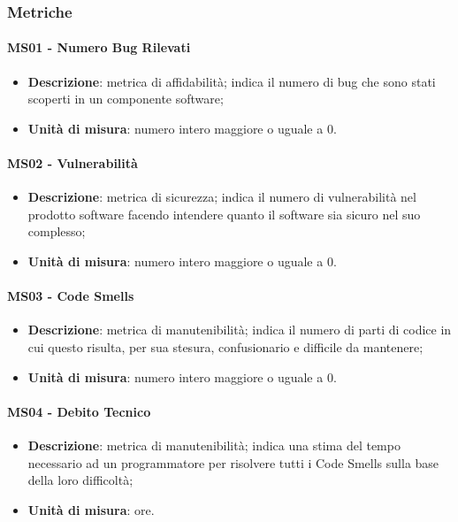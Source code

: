 	\subsubsection{Metriche}
		\paragraph{MS01 - Numero Bug Rilevati}
		\begin{itemize}
			\item \textbf{Descrizione}: metrica di affidabilità; indica il numero di bug che sono stati scoperti in un componente software;
			\item \textbf{Unità di misura}: numero intero maggiore o uguale a 0.
		\end{itemize}

        \paragraph{MS02 - Vulnerabilità}
        \begin{itemize}
            \item \textbf{Descrizione}: metrica di sicurezza; indica il numero di vulnerabilità nel prodotto software facendo intendere quanto il software sia sicuro nel suo complesso;
            \item \textbf{Unità di misura}: numero intero maggiore o uguale a 0.
        \end{itemize}

        \paragraph{MS03 - Code Smells}
        \begin{itemize}
            \item \textbf{Descrizione}: metrica di manutenibilità; indica il numero di parti di codice in cui questo risulta, per sua stesura, confusionario e difficile da mantenere;
            \item \textbf{Unità di misura}: numero intero maggiore o uguale a 0.
        \end{itemize}

        \paragraph{MS04 - Debito Tecnico}
        \begin{itemize}
            \item \textbf{Descrizione}: metrica di manutenibilità; indica una stima del tempo necessario ad un programmatore per risolvere tutti i Code Smells sulla base della loro difficoltà;
            \item \textbf{Unità di misura}: ore.
        \end{itemize}

